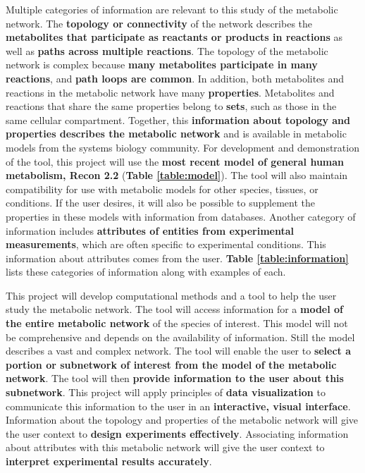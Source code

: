 Multiple categories of information are relevant to this study of the metabolic network.
The \textbf{topology or connectivity} of the network describes the \textbf{metabolites that participate as reactants or products in reactions} as well as \textbf{paths across multiple reactions}.
The topology of the metabolic network is complex because \textbf{many metabolites participate in many reactions}, and \textbf{path loops are common}.
In addition, both metabolites and reactions in the metabolic network have many \textbf{properties}.
Metabolites and reactions that share the same properties belong to \textbf{sets}, such as those in the same cellular compartment.
Together, this \textbf{information about topology and properties describes the metabolic network} and is available in metabolic models from the systems biology community.
For development and demonstration of the tool, this project will use the \textbf{most recent model of general human metabolism, Recon 2.2} \supercite{thiele_community-driven_2013, swainston_recon_2016} (\textbf{Table \ref{table:model}}).
The tool will also maintain compatibility for use with metabolic models for other species, tissues, or conditions.
If the user desires, it will also be possible to supplement the properties in these models with information from databases.
Another category of information includes \textbf{attributes of entities from experimental measurements}, which are often specific to experimental conditions.
This information about attributes comes from the user.
\textbf{Table \ref{table:information}} lists these categories of information along with examples of each.

This project will develop computational methods and a tool to help the user study the metabolic network.
The tool will access information for a \textbf{model of the entire metabolic network} of the species of interest.
This model will not be comprehensive and depends on the availability of information.
Still the model describes a vast and complex network.
The tool will enable the user to \textbf{select a portion or subnetwork of interest from the model of the metabolic network}.
The tool will then \textbf{provide information to the user about this subnetwork}.
This project will apply principles of \textbf{data visualization} \supercite{gehlenborg_visualization_2010, vehlow_visual_2015, pavlopoulos_visualizing_2015} to communicate this information to the user in an \textbf{interactive, visual interface}.
Information about the topology and properties of the metabolic network will give the user context to \textbf{design experiments effectively}.
Associating information about attributes with this metabolic network will give the user context to \textbf{interpret experimental results accurately}.

